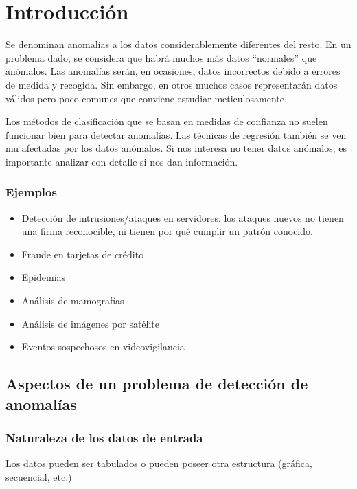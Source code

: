 \documentclass[a4paper,11pt,spanish]{report}
\let\stdsection\section
\let\stdsub\subsection
\let\stdsubsub\subsubsection
\renewcommand{\chapter}{\stdsection}
\renewcommand{\section}{\stdsub}
\renewcommand{\subsection}{\stdsubsub}
\begin{document}
\chapter{Introducción}
\label{sec-2-1}

Se denominan anomalías a los datos considerablemente diferentes del resto. En un problema dado, se considera que habrá muchos más datos ``normales'' que anómalos. Las anomalías serán, en ocasiones, datos incorrectos debido a errores de medida y recogida. Sin embargo, en otros muchos casos representarán datos válidos pero poco comunes que conviene estudiar meticulosamente.

Los métodos de clasificación que se basan en medidas de confianza no suelen funcionar bien para detectar anomalías. Las técnicas de regresión también se ven mu afectadas por los datos anómalos. Si nos interesa no tener datos anómalos, es importante analizar con detalle si nos dan información.

\subsection*{Ejemplos}
\label{sec-2-1-0-1}

\begin{itemize}
\item Detección de intrusiones/ataques en servidores: los ataques nuevos no tienen una firma reconocible, ni tienen por qué cumplir un patrón conocido.
\item Fraude en tarjetas de crédito
\item Epidemias
\item Análisis de mamografías
\item Análisis de imágenes por satélite
\item Eventos sospechosos en videovigilancia
\end{itemize}

\section{Aspectos de un problema de detección de anomalías}
\label{sec-2-1-1}

\subsection*{Naturaleza de los datos de entrada}
\label{sec-2-1-1-1}

Los datos pueden ser tabulados o pueden poseer otra estructura (gráfica, secuencial, etc.)
\end{document}

